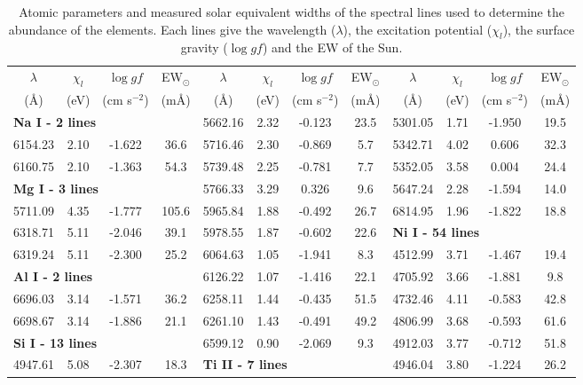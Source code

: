 \documentclass[dvips,12pt,a4paper]{report}
\begin{document}
{{\begin{table}[h]\tiny
\label {loggf}
  \centering
\caption[Atomic parameters of the spectral lines]{Atomic parameters and measured solar equivalent widths of the spectral lines used to determine the abundance of the elements. Each lines give the wavelength ($\lambda$), the excitation potential ($\chi_l$), the surface gravity ($\log gf$) and the EW of the Sun.}
  \begin{tabular}{c c c c | c c c c | c c c c}
\hline
\hline 
$\lambda$ & $\chi_l$ & $\log gf$ & EW$_\odot$  &$\lambda $ & $\chi_l$ & $\log gf$ & EW$_\odot$ &$\lambda $ & $\chi_l$ & $\log gf$ & EW$_\odot$ \\
(\AA) & (eV) & (cm s$^{-2}$) & (m\AA{}) & (\AA) & (eV) & (cm s$^{-2}$) & (m\AA{}) & (\AA) & (eV) & (cm s$^{-2}$) & (m\AA{}) \\
\hline
\multicolumn{3}{l}{\textbf{Na I - 2 lines}} &  & 5662.16 & 2.32 & -0.123 &  23.5 & 5301.05 & 1.71 & -1.950 &  19.5 \\
6154.23 & 2.10 & -1.622 &  36.6 & 5716.46 & 2.30 & -0.869 &   5.7 & 5342.71 & 4.02 &  0.606 &  32.3 \\
6160.75 & 2.10 & -1.363 &  54.3 & 5739.48 & 2.25 & -0.781 &   7.7 & 5352.05 & 3.58 &  0.004 &  24.4 \\
\multicolumn{3}{l}{\textbf{Mg I - 3 lines}} &  & 5766.33 & 3.29 &  0.326 &   9.6 & 5647.24 & 2.28 & -1.594 &  14.0 \\
5711.09 & 4.35 & -1.777 & 105.6 & 5965.84 & 1.88 & -0.492 &  26.7 & 6814.95 & 1.96 & -1.822 &  18.8 \\
6318.71 & 5.11 & -2.046 &  39.1 & 5978.55 & 1.87 & -0.602 &  22.6 & \multicolumn{3}{l}{\textbf{Ni I - 54 lines}} &  \\
6319.24 & 5.11 & -2.300 &  25.2 & 6064.63 & 1.05 & -1.941 &   8.3 & 4512.99 & 3.71 & -1.467 &  19.4 \\
\multicolumn{3}{l}{\textbf{Al I - 2 lines}} &  & 6126.22 & 1.07 & -1.416 &  22.1 & 4705.92 & 3.66 & -1.881 &   9.8 \\
6696.03 & 3.14 & -1.571 &  36.2 & 6258.11 & 1.44 & -0.435 &  51.5 & 4732.46 & 4.11 & -0.583 &  42.8 \\
6698.67 & 3.14 & -1.886 &  21.1 & 6261.10 & 1.43 & -0.491 &  49.2 & 4806.99 & 3.68 & -0.593 &  61.6 \\
\multicolumn{3}{l}{\textbf{Si I - 13 lines}} & & 6599.12 & 0.90 & -2.069 &   9.3 & 4912.03 & 3.77 & -0.712 &  51.8 \\
4947.61 & 5.08 & -2.307 &  18.3 & \multicolumn{3}{l}{\textbf{Ti II - 7 lines}} & &  4946.04 & 3.80 & -1.224 &  26.2 \\

\end{tabular}
\end{table}}}
\end{document}
